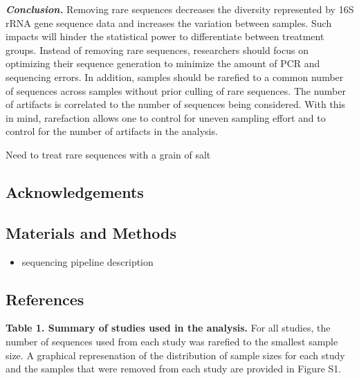 \documentclass[]{article}
\begin{document}
\textbf{\emph{Conclusion.}} Removing rare sequences decreases the
diversity represented by 16S rRNA gene sequence data and increases the
variation between samples. Such impacts will hinder the statistical
power to differentiate between treatment groups. Instead of removing
rare sequences, researchers should focus on optimizing their sequence
generation to minimize the amount of PCR and sequencing errors. In
addition, samples should be rarefied to a common number of sequences
across samples without prior culling of rare sequences. The number of
artifacts is correlated to the number of sequences being considered.
With this in mind, rarefaction allows one to control for uneven sampling
effort and to control for the number of artifacts in the analysis.

Need to treat rare sequences with a grain of salt

\newpage

\subsection{Acknowledgements}\label{acknowledgements}

\newpage

\subsection{Materials and Methods}\label{materials-and-methods}

\begin{itemize}
\itemsep1pt\parskip0pt
\item
  sequencing pipeline description
\end{itemize}

\newpage

\subsection{References}\label{references}

\newpage

\textbf{Table 1. Summary of studies used in the analysis.} For all
studies, the number of sequences used from each study was rarefied to
the smallest sample size. A graphical represenation of the distribution
of sample sizes for each study and the samples that were removed from
each study are provided in Figure S1.
\end{document}
